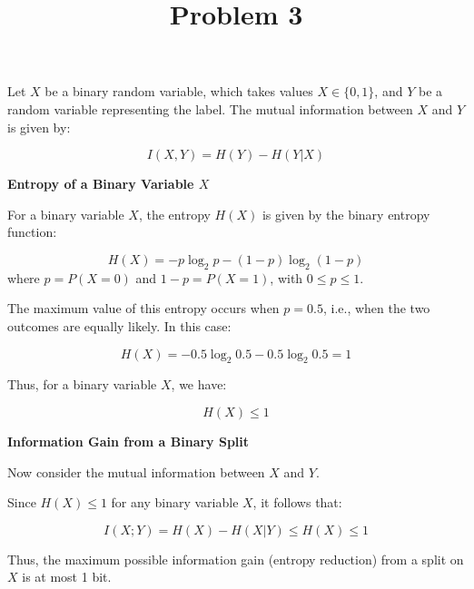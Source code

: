 \documentclass[12pt]{article}
\title{Problem 3}
\author{}
\date{}
\begin{document}
\maketitle
\thispagestyle{empty}

Let \( X \) be a binary random variable, which takes values \( X \in \{0, 1\} \), and \( Y \) be a random variable representing the label. The mutual information between \( X \) and \( Y \) is given by:

\[
I(X, Y) = H(Y) - H(Y|X)
\]

\textbf{Entropy of a Binary Variable \( X \)}

For a binary variable \( X \), the entropy \( H(X) \) is given by the binary entropy function:

\[
H(X) = -p \log_2 p - (1 - p) \log_2 (1 - p)
\]
where \( p = P(X = 0) \) and \( 1 - p = P(X = 1) \), with \( 0 \leq p \leq 1 \).

The maximum value of this entropy occurs when \( p = 0.5 \), i.e., when the two outcomes are equally likely. In this case:

\[
H(X) = -0.5 \log_2 0.5 - 0.5 \log_2 0.5 = 1
\]

Thus, for a binary variable \( X \), we have:

\[
H(X) \leq 1
\]

\textbf{Information Gain from a Binary Split}

Now consider the mutual information between \( X \) and \( Y \).

Since \( H(X) \leq 1 \) for any binary variable \( X \), it follows that:

\[
I(X; Y) = H(X) - H(X|Y) \leq H(X) \leq 1
\]

Thus, the maximum possible information gain (entropy reduction) from a split on \( X \) is at most 1 bit.
\end{document}
